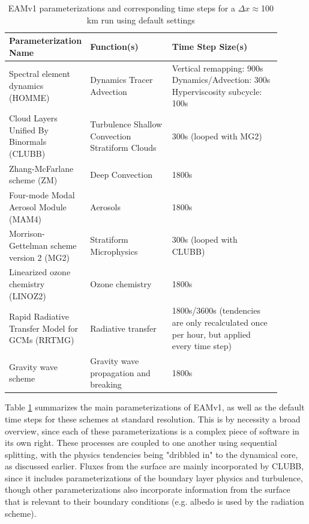 \documentclass [11pt, proquest] {uwthesis}[2020/02/24]
\begin{document}
\begin{table}
  \centering
  \begin{tabular}{|p{0.2\linewidth}|p{0.3\linewidth}|p{0.4\linewidth}|}
    \hline
    Parameterization Name & Function(s) & Time Step Size(s) \\
    \hline
    {Spectral element \newline dynamics (HOMME)} & {Dynamics \newline Tracer Advection} & {Vertical remapping: 900s \newline Dynamics/Advection: 300s \newline Hyperviscosity subcycle: 100s} \\
    \hline
    Cloud Layers Unified By Binormals (CLUBB) & {Turbulence \newline Shallow Convection \newline Stratiform Clouds} & 300s (looped with MG2) \\
    \hline
    Zhang-McFarlane scheme (ZM) & Deep Convection & 1800s \\
    \hline
    Four-mode Modal Aerosol Module (MAM4) & Aerosols & 1800s \\
    \hline
    Morrison-Gettelman scheme version 2 (MG2) & Stratiform Microphysics & 300s (looped with CLUBB) \\
    \hline
    Linearized ozone chemistry (LINOZ2) & Ozone chemistry & 1800s \\
    \hline
    Rapid Radiative Transfer Model for GCMs (RRTMG) & Radiative transfer & 1800s/3600s (tendencies are only recalculated once per hour, but applied every time step) \\
    \hline
    Gravity wave scheme & Gravity wave propagation and breaking & 1800s \\
    \hline
  \end{tabular}
  \caption{EAMv1 parameterizations and corresponding time steps for a $\Delta x\approx$100 km run using default
    settings}
  \label{tab:physparams}
\end{table}

Table \ref{tab:physparams} summarizes the main parameterizations of EAMv1, as well as the default time steps for these schemes at standard resolution. This is by necessity a broad overview, since each of these parameterizations is a complex piece of software in its own right. These processes are coupled to one another using sequential splitting, with the physics tendencies being "dribbled in" to the dynamical core, as discussed earlier. Fluxes from the surface are mainly incorporated by CLUBB, since it includes parameterizations of the boundary layer physics and turbulence, though other parameterizations also incorporate information from the surface that is relevant to their boundary conditions (e.g. albedo is used by the radiation scheme).
\end{document}
